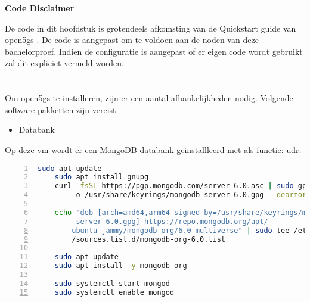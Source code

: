 \begin{center}
    \large\textbf{Code Disclaimer}
\end{center}

\vspace{0.5cm}

\noindent De code in dit hoofdstuk is grotendeels afkomsting van de Quickstart guide van \gls{open5gs} \autocite{Lee2025a}. De code is aangepast om te voldoen aan de noden van deze bachelorproef. Indien de configuratie is aangepast of er eigen code wordt gebruikt zal dit expliciet vermeld worden.
\vspace{0.3cm}

\section{}

Om \gls{open5gs} te installeren, zijn er een aantal afhankelijkheden nodig. Volgende software pakketten zijn vereist:

\begin{itemize}
    \item Databank
\end{itemize}

Op deze \gls{vm} wordt er een MongoDB databank geinstallleerd met als functie: \gls{udr}.





\begin{lstlisting}[basicstyle=\small, frame=single, breaklines=true, postbreak=\mbox{\textcolor{red}{$\hookrightarrow$}\space}, escapeinside ={\%,}, escapechar={!}, numbers=left, language=sh, caption=Installatie van MongoDB]
    sudo apt update
    sudo apt install gnupg
    curl -fsSL https://pgp.mongodb.com/server-6.0.asc | sudo gpg 
        -o /usr/share/keyrings/mongodb-server-6.0.gpg --dearmor

    echo "deb [arch=amd64,arm64 signed-by=/usr/share/keyrings/mongodb
        -server-6.0.gpg] https://repo.mongodb.org/apt/
        ubuntu jammy/mongodb-org/6.0 multiverse" | sudo tee /etc/apt
        /sources.list.d/mongodb-org-6.0.list

    sudo apt update
    sudo apt install -y mongodb-org

    sudo systemctl start mongod 
    sudo systemctl enable mongod
\end{lstlisting}

